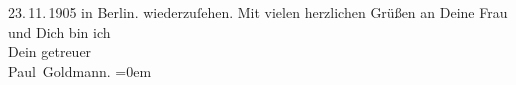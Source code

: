 \begin{ledgroupsized}[t]{13cm}
{{{                     23. 11. 1905 in
                     Berlin.}}}\label{K_L03080-5h} wiederzuſehen.\pend
           \pstart
           Mit vielen herzlichen Grüßen an Deine Frau und Dich bin ich {\\[\baselineskip]}Dein getreuer {\\[\baselineskip]}\spacefill\mbox{Paul Goldmann.}\pend
           \leftskip=0em{}
         
         \endnumbering{}\end{ledgroupsized}  \newcommand{\dateiname}{L03080}\newcommand{\titel}{Paul Goldmann an Arthur Schnitzler, 21. 8. [1905?]}\newcommand{\editorInnen}{Martin Anton Müller und Laura Untner}
      